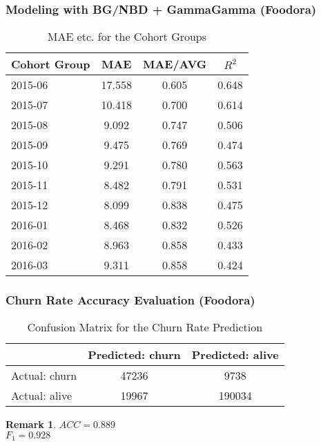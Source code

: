 \documentclass{beamer} %
\theoremstyle{definition} %
\begin{document}
\begin{frame}
\frametitle{Modeling with BG/NBD + GammaGamma (Foodora)}
\begin{center}
            \begin{table}
\begin{tabular}{l | c | c | c }
Cohort Group & MAE & MAE/AVG & $R^2$ \\
\hline \hline
2015-06 & 17.558 & 0.605 & 0.648\\ 
2015-07 & 10.418 & 0.700 & 0.614\\
2015-08 & 9.092 & 0.747 & 0.506\\
2015-09 & 9.475 & 0.769 & 0.474\\ 
2015-10 & 9.291 & 0.780 & 0.563\\ 
2015-11 & 8.482 & 0.791 & 0.531\\
2015-12 & 8.099 & 0.838 & 0.475\\
2016-01 & 8.468 & 0.832 & 0.526\\ 
2016-02 & 8.963 & 0.858 & 0.433\\ 
2016-03 & 9.311 & 0.858 & 0.424\\ 
\end{tabular}
\caption{MAE etc. for the Cohort Groups}
\end{table}
        \end{center}
\end{frame}

\begin{frame}
\frametitle{Churn Rate Accuracy Evaluation (Foodora)}
\begin{center}
            \begin{table}
\begin{tabular}{l | c | c }
 & Predicted: churn & Predicted: alive\\
\hline \hline
Actual: churn & 47236 & 9738\\ 
Actual: alive & 19967 & 190034
\end{tabular}
\caption{Confusion Matrix for the Churn Rate Prediction}
\end{table}
        \end{center}
\newtheorem{rmk}{Remark}        
       
\begin{rmk}
	$ACC=0.889$ \\    
    $F_1=0.928$
\end{rmk}
\end{frame}
\end{document}
